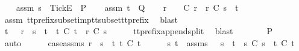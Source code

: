 \begin{isabellebody}
\ \ \isamarkupfalse%
\ assm{}{\isacharcolon}\ {\isachardoublequoteopen}s\ {\isacharat}\ {\isacharbrackleft}{\isacharbrackleft}Tick{\isacharbrackright}\isactrlsub E{\isacharbrackright}\ {\isasymin}\ P{\isachardoublequoteclose}\isanewline
\ \ \isamarkupfalse%
\ assm{}{\isacharcolon}\ {\isachardoublequoteopen}t\ {\isasymin}\ Q{\isachardoublequoteclose}\isanewline
\ \ \isamarkupfalse%
\ r\ \ {}{\isacharcolon}\ {\isachardoublequoteopen}{\isasymrho}\ {\isasymsubseteq}\isactrlsub C\ r\ {\isasymand}\ r\ {\isasymle}\isactrlsub C\ s\ {\isacharat}\ t{\isachardoublequoteclose}\isanewline
\ \ \ \ \isamarkupfalse%
\ assm{}\ tt{\isacharunderscore}prefix{\isacharunderscore}subset{\isacharunderscore}imp{\isacharunderscore}tt{\isacharunderscore}subset{\isacharunderscore}tt{\isacharunderscore}prefix\ \isamarkupfalse%
\ blast\isanewline
\ \ \isamarkupfalse%
\ \isamarkupfalse%
\ t{\isacharprime}\ \ {}{\isacharcolon}\ {\isachardoublequoteopen}{\isacharparenleft}r\ {\isacharequal}\ s\ {\isacharat}\ t{\isacharprime}\ {\isasymand}\ t{\isacharprime}\ {\isasymle}\isactrlsub C\ t{\isacharparenright}\ {\isasymor}\ r\ {\isasymle}\isactrlsub C\ s{\isachardoublequoteclose}\isanewline
\ \ \ \ \isamarkupfalse%
\ tt{\isacharunderscore}prefix{\isacharunderscore}append{\isacharunderscore}split\ \isamarkupfalse%
\ blast\isanewline
\ \ \isamarkupfalse%
\ \isamarkupfalse%
\ {\isachardoublequoteopen}{\isasymrho}\ {\isasymin}\ P{\isachardoublequoteclose}\isanewline
\ \ \isamarkupfalse%
\ auto\isanewline
\ \ \ \ \isamarkupfalse%
\ case{\isacharunderscore}assms{\isacharcolon}\ {\isachardoublequoteopen}r\ {\isacharequal}\ s\ {\isacharat}\ t{\isacharprime}{\isachardoublequoteclose}\ {\isachardoublequoteopen}t{\isacharprime}\ {\isasymle}\isactrlsub C\ t{\isachardoublequoteclose}\isanewline
\ \ \ \ \isamarkupfalse%
\ s{\isacharprime}\ t{\isacharprime}{\isacharprime}\ \ {\isasymrho}{\isacharunderscore}assms{\isacharcolon}\ {\isachardoublequoteopen}{\isasymrho}\ {\isacharequal}\ s{\isacharprime}\ {\isacharat}\ t{\isacharprime}{\isacharprime}\ {\isasymand}\ s{\isacharprime}\ {\isasymsubseteq}\isactrlsub C\ s\ {\isasymand}\ t{\isacharprime}{\isacharprime}\ {\isasymsubseteq}\isactrlsub C\ t{\isacharprime}{\isachardoublequoteclose}\isanewline
\ \ \ \ \ \ \isamarkupfalse%

\end{isabellebody}
